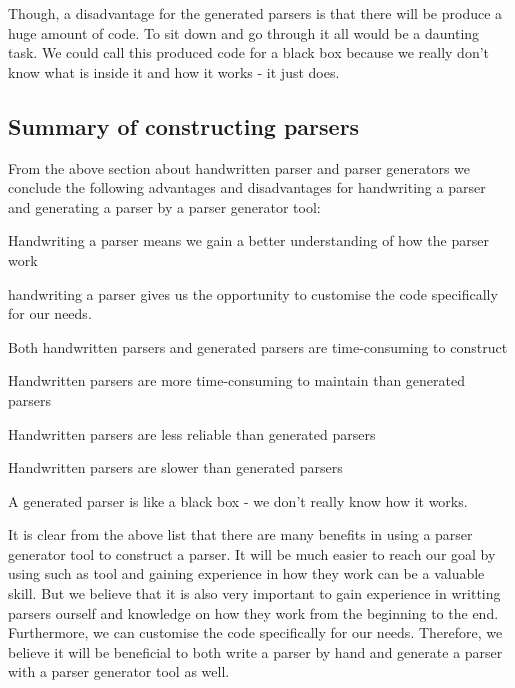Though, a disadvantage for the generated parsers is that there will be produce a
huge amount of code. To sit down and go through it all would be a daunting task.
We could call this produced code for a black box because we really don't know
what is inside it and how it works - it just does.

\subsection{Summary of constructing parsers}
\label{subsec:summary-parser}
From the above section about handwritten parser and parser generators we
conclude the following advantages and disadvantages for handwriting a parser and
generating a parser by a parser generator tool:

\begin{dlist}
  \item Handwriting a parser means we gain a better understanding of how the
    parser work
  \item handwriting a parser gives us the opportunity to customise the code
    specifically for our needs.
  \item Both handwritten parsers and generated parsers are time-consuming to
    construct
  \item Handwritten parsers are more time-consuming to maintain than generated
    parsers
  \item Handwritten parsers are less reliable than generated parsers
  \item Handwritten parsers are slower than generated parsers
  \item A generated parser is like a black box - we don't really know how it
    works.
\end{dlist}

It is clear from the above list that there are many benefits in using a parser
generator tool to construct a parser. It will be much easier to reach our goal
by using such as tool and gaining experience in how they work can be a valuable
skill. But we believe that it is also very important to gain experience in
writting parsers ourself and knowledge on how they work from the beginning to
the end. Furthermore, we can customise the code specifically for our needs.
Therefore, we believe it will be beneficial to both write a parser by hand and
generate a parser with a parser generator tool as well.
